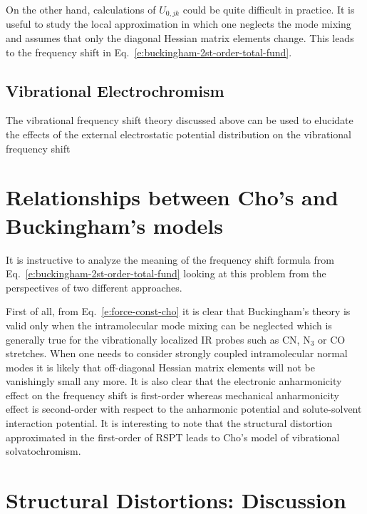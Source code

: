 \documentclass[a4paper,titlepage,twoside,fleqn,12pt]{book}
\begin{document}
\begin{refsection}
On the other hand, calculations of $U_{0,jk}$ could be quite difficult 
in practice. It is useful to study the local approximation in which
one neglects the mode mixing and assumes that only the diagonal Hessian
matrix elements change. This leads to the frequency shift in Eq.~\eqref{e:buckingham-2st-order-total-fund}.

\subsection{Vibrational Electrochromism}

The vibrational frequency shift theory discussed above 
can be used
to elucidate the effects of the external electrostatic 
potential distribution on the vibrational frequency shift

\section{Relationships between Cho's and Buckingham's models}

It is instructive to analyze the meaning of the frequency shift
formula from Eq.~\eqref{e:buckingham-2st-order-total-fund}
looking at this problem from the perspectives of two different approaches.

First of all, from Eq.~\eqref{e:force-const-cho} it is clear 
that Buckingham's theory is valid only
when the intramolecular mode mixing can be neglected which
is generally true for the vibrationally localized IR probes
such as CN, N$_3$ or CO stretches. When one needs to consider
strongly coupled intramolecular normal modes it is likely
that off-diagonal Hessian matrix elements will not be vanishingly
small any more. It is also
clear that the electronic anharmonicity effect on the frequency 
shift is first\hyp{}order
whereas mechanical anharmonicity effect is second\hyp{}order 
with respect to the anharmonic potential and solute\hyp{}solvent
interaction potential. It is interesting to note 
that the structural distortion approximated
in the first\hyp{}order of RSPT leads to Cho's model of vibrational
solvatochromism. 

\section{Structural Distortions: Discussion}


\end{refsection}
\end{document}
